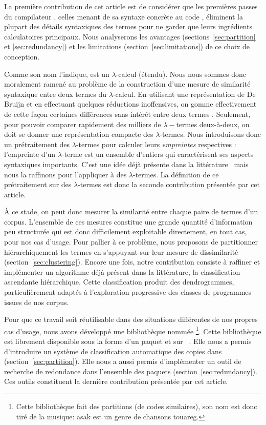 La première contribution de cet article est de considérer que les
premières passes du compilateur {\OCaml}, celles menant de sa syntaxe
concrète au code {\LambdaCode}, éliminent la plupart des détails
syntaxiques des termes {\OCaml} pour ne garder que leurs ingrédients
calculatoires principaux. Nous analyserons les avantages
(sections~\ref{sec:partition} et \ref{sec:redundancy}) et les
limitations (section~\ref{sec:limitations}) de ce choix de conception.

Comme son nom l'indique, {\LambdaCode} est un $\lambda$-calcul
(étendu). Nous nous sommes donc moralement ramené au problème de la
construction d'une mesure de similarité syntaxique entre deux termes
du $\lambda$-calcul. En utilisant une représentation de De Bruijn et
en effectuant quelques réductions inoffensives, on gomme effectivement
de cette façon certaines différences sans intérêt entre deux termes
{\OCaml}. Seulement, pour pouvoir comparer rapidement des milliers de
$\lambda-$termes deux-à-deux, on doit se donner une représentation
compacte des $\lambda$-termes. Nous introduisons donc un prétraitement
des $\lambda$-termes pour calculer leurs \textit{empreintes}
respectives : l'empreinte d'un $\lambda$-terme est un ensemble
d'entiers qui caractérisent ses aspects syntaxiques importants. C'est
une idée déjà présente dans la
littérature~\cite{chilowicz:hal-00627811} mais nous la raffinons pour
l'appliquer à des $\lambda$-termes.  La définition de ce prétraitement
sur des $\lambda$-termes est donc la seconde contribution présentée
par cet article.

À ce stade, on peut donc mesurer la similarité entre chaque paire de
termes d'un corpus. L'ensemble de ces mesures constitue une grande
quantité d'information peu structurée qui est donc difficilement
exploitable directement, en tout cas, pour nos cas d'usage. Pour
pallier à ce problème, nous proposons de partitionner hiérarchiquement
les termes en s'appuyant sur leur mesure de dissimilarité
(section~\ref{sec:clustering}). Encore une fois, notre contribution
consiste à raffiner et implémenter un algorithme déjà présent dans la
littérature, la classification ascendante hiérarchique. Cette
classification produit des dendrogrammes, particulièrement adaptés à
l'exploration progressive des classes de programmes issues de nos
corpus.

Pour que ce travail soit réutilisable dans des situations différentes
de nos propres cas d'usage, nous avons développé une bibliothèque
nommée {\Asak}\footnote{Cette bibliothèque fait des partitions (de
codes similaires), son nom est donc tiré de la musique: asak est un
genre de chansons touareg.}.  Cette bibliothèque est librement
disponible sous la forme d'un paquet {\Opam} et sur
{\GitHub}~\cite{asak}.  Elle nous a permis d'introduire un système de
classification automatique des copies dans
{\LearnOCaml}~\cite{learnocaml} (section~\ref{sec:partition}). Elle
nous a aussi permis d'implémenter un outil de recherche de redondance
dans l'ensemble des paquets {\Opam}
(section~\ref{sec:redundancy}). Ces outils constituent la dernière
contribution présentée par cet article.

